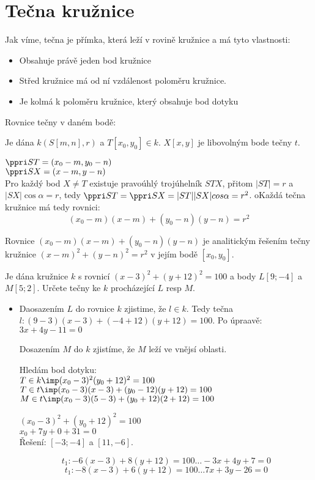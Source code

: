 
\BeginDoc{}
\section{Tečna kružnice}
\Poz
Jak víme, tečna je přímka, která leží v rovině kružnice a má tyto vlastnosti:
\begin{itemize}
	\item Obsahuje právě jeden bod kružnice
	\item Střed kružnice má od ní vzdálenost poloměru kružnice.
	\item Je kolmá k poloměru kružnice, který obsahuje bod dotyku
\end{itemize}
\Poz Rovnice tečny v daném bodě:

Je dána $k(S[m,n],r)$ a $T[x_0,y_0]\in k$.
$X[x,y]$ je libovolným bode tečny $t$.

$\ve{ST} = (x_0-m,y_0 - n)$\\
$\ve{SX} = (x  -m,y   - n)$\\

Pro každý bod $X\neq T$ existuje pravoúhlý trojúhelník $STX$,
přitom $|ST| = r$ a $|SX| \cos \alpha = r$, tedy $\ve{ST} = \ve {SX} = |ST|\*|SX|\*cos\alpha = r^2$.
oKaždá tečna kružnice má tedy rovnici:
$$(x_0 - m)(x-m) + (y_0-n)(y-n) = r^2 $$

\V Rovnice $(x_0 - m) (x-m) + (y_0 - n) (y-n)$ je analitickým řešením tečny kružnice $(x-m)^2 + (y-n)^2 = r^2$ v jejím bodě $[x_0,y_0]$.

\Pr Je dána kružnice $k$ s rovnicí $(x-3)^2 + (y+12)^2 = 100$ a body $L[9;-4]$ a $M[5;2]$.
Určete tečny ke $k$ procházející $L$ resp $M$.

\begin{itemize}
	\item Daosazením $L$ do rovnice $k$ zjistime, že $l\in k$.
		Tedy tečna $l:(9-3)(x-3) + (-4+12)(y+12) = 100$.
		Po úpraavě: $3x+4y-11=0$

		Dosazením $M$ do $k$ zjistíme, že $M$ leží ve vnějsí oblasti.

		Hledám bod dotyku:\\
		$T \in k \imp (x_0-3)^2 (y_0+12)^2 = 100$\\
		$T\in t \imp (x_0-3)(x-3) + (y_0-12)(y+12) = 100$\\
		$M \in t \imp (x_0-3)(5-3) + (y_0+12)(2+12) = 100$

		$(x_0-3)^2 + (y_0+12)^2 = 100$\\
		$x_0+7y+0  + 31 = 0$\\

		Řešení: $[-3;-4]$ a $[11,-6]$.

		$$t_1: -6(x-3) + 8(y+12) = 100 \dots -3x+4y+7=0$$
		$$t_1: -8(x-3) + 6(y+12) = 100 \dots 7x+3y-26=0$$
\end{itemize}

